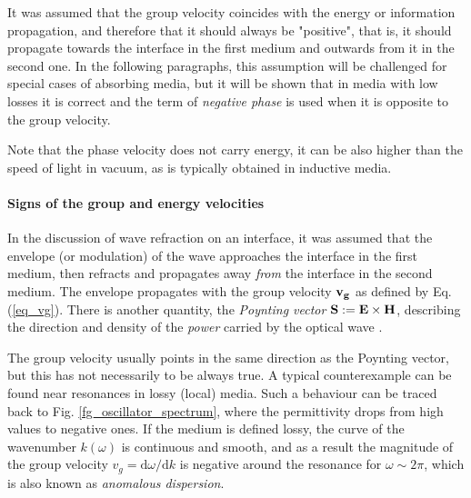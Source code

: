 It was assumed that the group velocity coincides with the energy or information propagation, and therefore that it should always be "positive", that is, it should propagate towards the interface in the first medium and outwards from it in the second one. In the following paragraphs, this assumption will be challenged for special cases of absorbing media, but it will be shown that in media with low losses it is correct and the term of \textit{negative phase}  is used when it is opposite to the group velocity.

Note that the phase velocity does not carry energy, it can be also higher than the speed of light in vacuum, as is typically obtained in inductive media.

\paragraph{Signs of the group and energy velocities}  %
In the discussion of wave refraction on an interface, it was assumed that the envelope (or modulation) of the wave approaches the interface in the first medium, then refracts and propagates away \textit{from} the interface in the second medium. The envelope propagates with the group velocity ${\mathbf{v_g}}$ as defined by Eq. (\ref{eq_vg}). There is another quantity, the \textit{Poynting vector} $\mathbf{S} := \mathbf{E}\times\mathbf{H}$, describing the direction and density of the \textit{power} carried by the optical wave \cite[p. 16]{klingshirn2007semiconductor}. 

The group velocity usually points in the same direction as the Poynting vector, but this has not necessarily to be always true. A typical counterexample can be found near resonances in lossy (local) media. Such a behaviour can be traced back to Fig. \ref{fg_oscillator_spectrum}, where the permittivity drops from high values to negative ones. If the medium is defined lossy, the curve of the wavenumber $k(\omega)$ is continuous and smooth, and as a result the magnitude of the group velocity $v_g = \mathrm{d}\omega / \mathrm{d}k$ is negative around the resonance for $\omega \sim 2\pi$, %
which is also known as \textit{anomalous dispersion}. 

